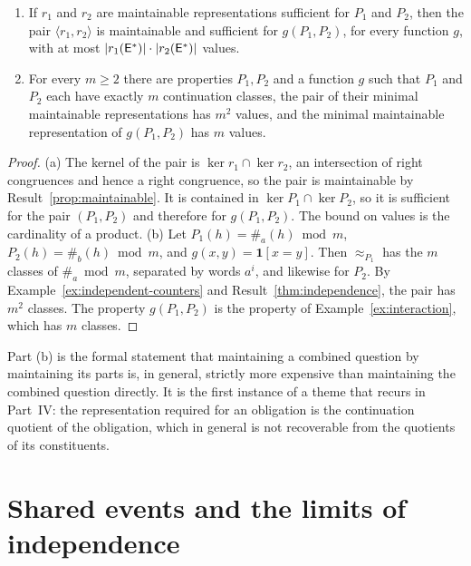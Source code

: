 \begin{newresult}\label{thm:composition}
\begin{enumerate}[nosep,label=(\alph*)]
  \item If $r_1$ and $r_2$ are maintainable representations sufficient for $P_1$ and $P_2$, then the pair $\langle r_1,r_2\rangle$ is maintainable and sufficient for $g(P_1,P_2)$, for every function $g$, with at most $|r_1(\mathsf{E}^{*})|\cdot|r_2(\mathsf{E}^{*})|$ values.
  \item For every $m\ge2$ there are properties $P_1,P_2$ and a function $g$ such that $P_1$ and $P_2$ each have exactly $m$ continuation classes, the pair of their minimal maintainable representations has $m^{2}$ values, and the minimal maintainable representation of $g(P_1,P_2)$ has $m$ values.
\end{enumerate}
\end{newresult}
\begin{proof}
(a) The kernel of the pair is $\ker r_1\cap\ker r_2$, an intersection of right congruences and hence a right congruence, so the pair is maintainable by Result~\ref{prop:maintainable}. It is contained in $\ker P_1\cap\ker P_2$, so it is sufficient for the pair $(P_1,P_2)$ and therefore for $g(P_1,P_2)$. The bound on values is the cardinality of a product. (b) Let $P_1(h)=\#_a(h)\bmod m$, $P_2(h)=\#_b(h)\bmod m$, and $g(x,y)=\mathbf 1[x=y]$. Then $\approx_{P_1}$ has the $m$ classes of $\#_a\bmod m$, separated by words $a^{i}$, and likewise for $P_2$. By Example~\ref{ex:independent-counters} and Result~\ref{thm:independence}, the pair has $m^{2}$ classes. The property $g(P_1,P_2)$ is the property of Example~\ref{ex:interaction}, which has $m$ classes.
\end{proof}

Part (b) is the formal statement that maintaining a combined question by maintaining its parts is, in general, strictly more expensive than maintaining the combined question directly. It is the first instance of a theme that recurs in Part~IV: the representation required for an obligation is the continuation quotient of the obligation, which in general is not recoverable from the quotients of its constituents.


\section{Shared events and the limits of independence}\label{sec:shared-events}

